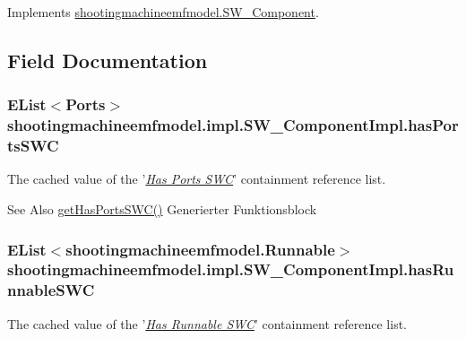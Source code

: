 Implements \hyperlink{interfaceshootingmachineemfmodel_1_1_s_w___component_a48fba8171e471bec62c19b27b38c5a98}{shootingmachineemfmodel.\-S\-W\-\_\-\-Component}.



\subsection{Field Documentation}
\hypertarget{classshootingmachineemfmodel_1_1impl_1_1_s_w___component_impl_ab662a79292869cbd21e936cb6b303251}{
\subsubsection[{has\-Ports\-S\-W\-C}]{\setlength{\rightskip}{0pt plus 5cm}E\-List$<${\bf Ports}$>$ shootingmachineemfmodel.\-impl.\-S\-W\-\_\-\-Component\-Impl.\-has\-Ports\-S\-W\-C\hspace{0.3cm}{\ttfamily [protected]}}}\label{classshootingmachineemfmodel_1_1impl_1_1_s_w___component_impl_ab662a79292869cbd21e936cb6b303251}
The cached value of the '\hyperlink{classshootingmachineemfmodel_1_1impl_1_1_s_w___component_impl_a506d6529374f47b28cb78ec920852c3b}{{\itshape Has Ports S\-W\-C}}' containment reference list.

\begin{DoxySeeAlso}{See Also}
\hyperlink{classshootingmachineemfmodel_1_1impl_1_1_s_w___component_impl_a506d6529374f47b28cb78ec920852c3b}{get\-Has\-Ports\-S\-W\-C()} Generierter Funktionsblock  
\end{DoxySeeAlso}
\hypertarget{classshootingmachineemfmodel_1_1impl_1_1_s_w___component_impl_ab13b9dcc9bf1f1edc9ab38ff710f81ed}{
\subsubsection[{has\-Runnable\-S\-W\-C}]{\setlength{\rightskip}{0pt plus 5cm}E\-List$<${\bf shootingmachineemfmodel.\-Runnable}$>$ shootingmachineemfmodel.\-impl.\-S\-W\-\_\-\-Component\-Impl.\-has\-Runnable\-S\-W\-C\hspace{0.3cm}{\ttfamily [protected]}}}\label{classshootingmachineemfmodel_1_1impl_1_1_s_w___component_impl_ab13b9dcc9bf1f1edc9ab38ff710f81ed}
The cached value of the '\hyperlink{classshootingmachineemfmodel_1_1impl_1_1_s_w___component_impl_afb6ead0797fbb25059fe4a7a507cfb3e}{{\itshape Has Runnable S\-W\-C}}' containment reference list.

